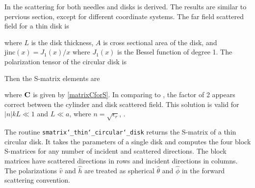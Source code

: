 In \cite{schiffer1979light} the scattering for both needles and disks is derived. The results are similar to pervious section, except for different coordinate systems. The far field scattered field for a thin disk is

\noindent where $L$ is the disk thickness, $A$ is cross sectional area of the disk, and $\textrm{jinc}(x) = J_1(x)/x$ where $J_1(x)$ is the Bessel function of degree 1. The polarization tensor of the circular disk is 
  
  
Then the S-matrix elements are 

\noindent where $\mathbf{C}$ is given by \eqref{matrixCforS}. In comparing \cite{schiffer1979light} to \cite{sarabandi1990low, stiles1996scattering}, the factor of 2 appears correct between the cylinder and disk scattered field. This solution is valid for $\vert n \vert kL \ll 1$ and $L \ll a$, where $n = \sqrt{\epsilon_r}$, \cite{schiffer1979light}.

The routine \texttt{smatrix\char`_thin\char`_circular\char`_disk} returns the S-matrix of a thin circular disk. It takes the parameters of a single disk and computes the four block S-matrices for any number of incident and scattered directions. The block matrices have scattered directions in rows and incident directions in columns. The polarizations $\hat{v}$ and $\hat{h}$ are treated as spherical $\hat{\theta}$ and $\hat{\phi}$ in the forward scattering convention.

